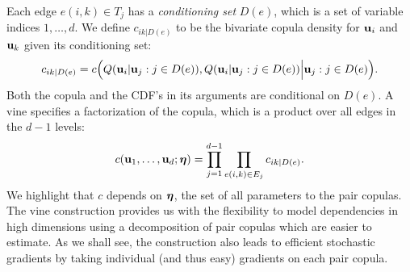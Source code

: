 Each edge
$e(i,k) \in T_j$ has a
\emph{conditioning set} $D(e)$, which is a set of variable indices
$1,\ldots,d$. We define
$c_{ik|D(e)}$ to be the bivariate copula density for $\boldsymbol{\mathbf{u}}_i$ and
$\boldsymbol{\mathbf{u}}_k$ given its conditioning set:
\begin{equation}
c_{ik|D(e)} = c\Big( Q(\boldsymbol{\mathbf{u}}_i|\boldsymbol{\mathbf{u}}_j : j \in D(e)), Q(\boldsymbol{\mathbf{u}}_i|\boldsymbol{\mathbf{u}}_j :
j \in D(e)) \Big| \boldsymbol{\mathbf{\boldsymbol{\mathbf{u}}}}_j : j\in D(e)\Big).
\label{eq:defcjk}
\end{equation}
Both the copula and the CDF's in its arguments are conditional
on $D(e)$. A vine specifies a factorization of the
copula, which is a product over all edges in the $d-1$ levels:
\begin{equation}
  c(\boldsymbol{\mathbf{u}}_1,\ldots,\boldsymbol{\mathbf{u}}_d; \boldsymbol{\mathbf{\eta}}) = \prod_{j=1}^{d-1}\prod_{e(i,k)\in E_j} c_{ik|D(e)}.
\label{eq:vinedecomp}
\end{equation}
%
%
We highlight that $c$ depends on $\boldsymbol{\mathbf{\eta}}$, the set of all parameters to
the pair copulas.  The vine construction provides us with the
flexibility to model dependencies in high dimensions using a
decomposition of pair copulas which are easier to estimate. As we
shall see,
the construction also leads to efficient stochastic gradients by
taking individual (and thus easy) gradients on each pair copula.

